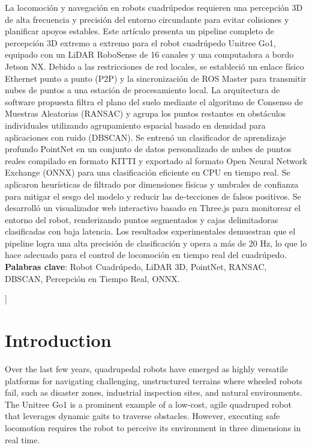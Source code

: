 \documentclass[a4paper,twocolumn]{article}
\begin{document}
\renewcommand{\abstractname}{Resumen}
\begin{onecolabstract}
La locomoción y navegación en robots cuadrúpedos requieren una percepción 3D de alta frecuencia y precisión del entorno circundante para evitar colisiones y planificar apoyos estables. Este artículo presenta un pipeline completo de percepción 3D extremo a extremo para el robot cuadrúpedo Unitree Go1, equipado con un LiDAR RoboSense de 16 canales y una computadora a bordo Jetson NX. Debido a las restricciones de red locales, se estableció un enlace físico Ethernet punto a punto (P2P) y la sincronización de ROS Master para transmitir nubes de puntos a una estación de procesamiento local. La arquitectura de software propuesta filtra el plano del suelo mediante el algoritmo de Consenso de Muestras Aleatorias (RANSAC) y agrupa los puntos restantes en obstáculos individuales utilizando agrupamiento espacial basado en densidad para aplicaciones con ruido (DBSCAN). Se entrenó un clasificador de aprendizaje profundo PointNet en un conjunto de datos personalizado de nubes de puntos reales compilado en formato KITTI y exportado al formato Open Neural Network Exchange (ONNX) para una clasificación eficiente en CPU en tiempo real. Se aplicaron heurísticas de filtrado por dimensiones físicas y umbrales de confianza para mitigar el sesgo del modelo y reducir las de-tecciones de falsos positivos. Se desarrolló un visualizador web interactivo basado en Three.js para monitorear el entorno del robot, renderizando puntos segmentados y cajas delimitadoras clasificadas con baja latencia. Los resultados experimentales demuestran que el pipeline logra una alta precisión de clasificación y opera a más de 20 Hz, lo que lo hace adecuado para el control de locomoción en tiempo real del cuadrúpedo.\\

\noindent\textbf{Palabras clave}: Robot Cuadrúpedo, LiDAR 3D, PointNet, RANSAC, DBSCAN, Percepción en Tiempo Real, ONNX.
\vspace{3ex}
\end{onecolabstract}
]

\section{Introduction}
Over the last few years, quadrupedal robots have emerged as highly versatile platforms for navigating challenging, unstructured terrains where wheeled robots fail, such as disaster zones, industrial inspection sites, and natural environments. The Unitree Go1 is a prominent example of a low-cost, agile quadruped robot that leverages dynamic gaits to traverse obstacles. However, executing safe locomotion requires the robot to perceive its environment in three dimensions in real time. 
\end{document}
